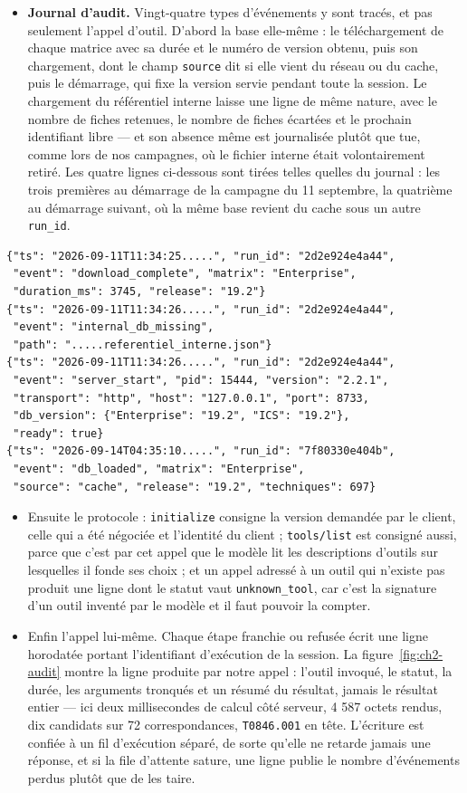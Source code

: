 \begin{itemize}
\tightlist
\item
  \textbf{Journal d'audit.} Vingt-quatre types d'événements y sont tracés, et pas seulement l'appel d'outil. D'abord la base elle-même : le téléchargement de chaque matrice avec sa durée et le numéro de version obtenu, puis son chargement, dont le champ \texttt{source} dit si elle vient du réseau ou du cache, puis le démarrage, qui fixe la version servie pendant toute la session. Le chargement du référentiel interne laisse une ligne de même nature, avec le nombre de fiches retenues, le nombre de fiches écartées et le prochain identifiant libre --- et son absence même est journalisée plutôt que tue, comme lors de nos campagnes, où le fichier interne était volontairement retiré. Les quatre lignes ci-dessous sont tirées telles quelles du journal : les trois premières au démarrage de la campagne du 11 septembre, la quatrième au démarrage suivant, où la même base revient du cache sous un autre \texttt{run\_id}.
\end{itemize}

\begin{verbatim}
{"ts": "2026-09-11T11:34:25.....", "run_id": "2d2e924e4a44",
 "event": "download_complete", "matrix": "Enterprise",
 "duration_ms": 3745, "release": "19.2"}
{"ts": "2026-09-11T11:34:26.....", "run_id": "2d2e924e4a44",
 "event": "internal_db_missing",
 "path": ".....referentiel_interne.json"}
{"ts": "2026-09-11T11:34:26.....", "run_id": "2d2e924e4a44",
 "event": "server_start", "pid": 15444, "version": "2.2.1",
 "transport": "http", "host": "127.0.0.1", "port": 8733,
 "db_version": {"Enterprise": "19.2", "ICS": "19.2"},
 "ready": true}
{"ts": "2026-09-14T04:35:10.....", "run_id": "7f80330e404b",
 "event": "db_loaded", "matrix": "Enterprise",
 "source": "cache", "release": "19.2", "techniques": 697}
\end{verbatim}

\begin{itemize}
\tightlist
\item
  Ensuite le protocole : \texttt{initialize} consigne la version demandée par le client, celle qui a été négociée et l'identité du client ; \texttt{tools/list} est consigné aussi, parce que c'est par cet appel que le modèle lit les descriptions d'outils sur lesquelles il fonde ses choix ; et un appel adressé à un outil qui n'existe pas produit une ligne dont le statut vaut \texttt{unknown\_tool}, car c'est la signature d'un outil inventé par le modèle et il faut pouvoir la compter.
\item
  Enfin l'appel lui-même. Chaque étape franchie ou refusée écrit une ligne horodatée portant l'identifiant d'exécution de la session. La figure~\ref{fig:ch2-audit} montre la ligne produite par notre appel : l'outil invoqué, le statut, la durée, les arguments tronqués et un résumé du résultat, jamais le résultat entier --- ici deux millisecondes de calcul côté serveur, 4 587 octets rendus, dix candidats sur 72 correspondances, \texttt{T0846.001} en tête. L'écriture est confiée à un fil d'exécution séparé, de sorte qu'elle ne retarde jamais une réponse, et si la file d'attente sature, une ligne publie le nombre d'événements perdus plutôt que de les taire.
\end{itemize}

